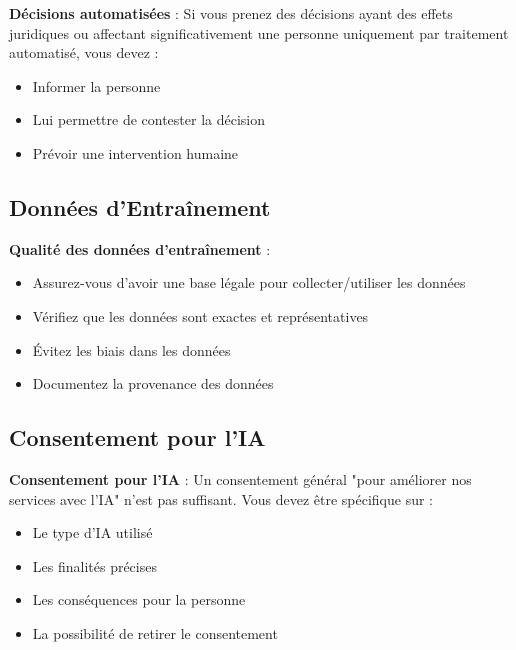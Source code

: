 \documentclass[11pt,a4paper]{article}
\begin{document}
\begin{legalbox}
\textbf{Décisions automatisées} : Si vous prenez des décisions ayant des effets juridiques ou affectant significativement une personne uniquement par traitement automatisé, vous devez :
\begin{itemize}
    \item Informer la personne
    \item Lui permettre de contester la décision
    \item Prévoir une intervention humaine
\end{itemize}
\end{legalbox}

\subsection{Données d'Entraînement}

\begin{importantbox}
\textbf{Qualité des données d'entraînement} : 
\begin{itemize}
    \item Assurez-vous d'avoir une base légale pour collecter/utiliser les données
    \item Vérifiez que les données sont exactes et représentatives
    \item Évitez les biais dans les données
    \item Documentez la provenance des données
\end{itemize}
\end{importantbox}

\subsection{Consentement pour l'IA}

\begin{dangerbox}
\textbf{Consentement pour l'IA} : Un consentement général "pour améliorer nos services avec l'IA" n'est pas suffisant. Vous devez être spécifique sur :
\begin{itemize}
    \item Le type d'IA utilisé
    \item Les finalités précises
    \item Les conséquences pour la personne
    \item La possibilité de retirer le consentement
\end{itemize}
\end{dangerbox}
\end{document}
